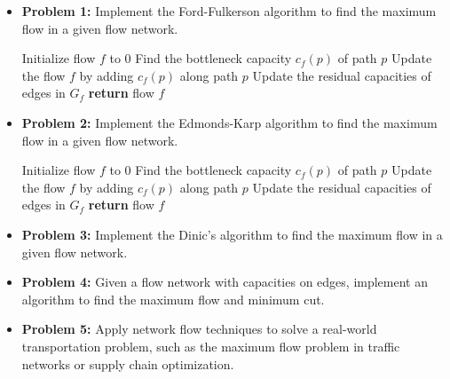 \documentclass[12pt]{book} %
\begin{document}
\begin{itemize}
    \item \textbf{Problem 1:} Implement the Ford-Fulkerson algorithm to find the maximum flow in a given flow network.
    
    \begin{algorithm}
    \caption{Ford-Fulkerson Algorithm}\label{ford-fulkerson}
    \begin{algorithmic}[1]
    \State Initialize flow $f$ to 0
    \State Find the bottleneck capacity $c_f(p)$ of path $p$
    \State Update the flow $f$ by adding $c_f(p)$ along path $p$
    \State Update the residual capacities of edges in $G_f$
    \EndWhile
    \State \textbf{return} flow $f$
    \EndProcedure
    \end{algorithmic}
    \end{algorithm}
    
    
    \item \textbf{Problem 2:} Implement the Edmonds-Karp algorithm to find the maximum flow in a given flow network.
    
    \begin{algorithm}
    \caption{Edmonds-Karp Algorithm}\label{edmonds-karp}
    \begin{algorithmic}[1]
    \State Initialize flow $f$ to 0
    \State Find the bottleneck capacity $c_f(p)$ of path $p$
    \State Update the flow $f$ by adding $c_f(p)$ along path $p$
    \State Update the residual capacities of edges in $G_f$
    \EndWhile
    \State \textbf{return} flow $f$
    \EndProcedure
    \end{algorithmic}
    \end{algorithm}
    
    \FloatBarrier
    
    
    \item \textbf{Problem 3:} Implement the Dinic's algorithm to find the maximum flow in a given flow network.
    
    \item \textbf{Problem 4:} Given a flow network with capacities on edges, implement an algorithm to find the maximum flow and minimum cut.
    
    \item \textbf{Problem 5:} Apply network flow techniques to solve a real-world transportation problem, such as the maximum flow problem in traffic networks or supply chain optimization.
\end{itemize}
\end{document}
